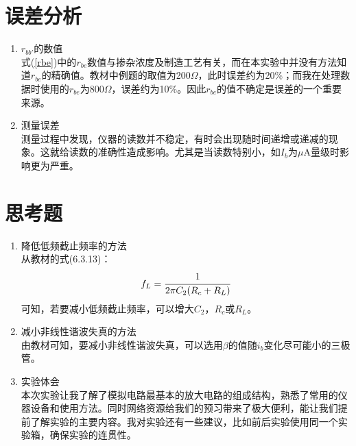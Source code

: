 \documentclass[a4paper]{article}
\begin{document}
\section{误差分析}
\begin{enumerate}
\item $r_{bb'}$的数值\\
式(\ref{rbe})中的$r_{be}$数值与掺杂浓度及制造工艺有关，而在本实验中并没有方法知道$r_{be}$的精确值。教材中例题的取值为200$\Omega$，此时误差约为20\%；而我在处理数据时使用的$r_{be}$为800$\Omega$，误差约为10\%。因此$r_{be}$的值不确定是误差的一个重要来源。
\item 测量误差\\
测量过程中发现，仪器的读数并不稳定，有时会出现随时间递增或递减的现象。这就给读数的准确性造成影响。尤其是当读数特别小，如$I_b$为$\mu$A量级时影响更为严重。
\end{enumerate}
\section{思考题}
\begin{enumerate}
\item 降低低频截止频率的方法\\
从教材的式(6.3.13)：
\begin{equation}
f_L = \cfrac{1}{2\pi C_{2}(R_c+R_L)}
\end{equation}
可知，若要减小低频截止频率，可以增大$C_2$，$R_c$或$R_L$。
\item 减小非线性谐波失真的方法\\
由教材可知，要减小非线性谐波失真，可以选用$\beta$的值随$i_b$变化尽可能小的三极管。
\item 实验体会\\
本次实验让我了解了模拟电路最基本的放大电路的组成结构，熟悉了常用的仪器设备和使用方法。同时网络资源给我们的预习带来了极大便利，能让我们提前了解实验的主要内容。我对实验还有一些建议，比如前后实验使用同一个实验箱，确保实验的连贯性。
\end{enumerate}


\end{document}
